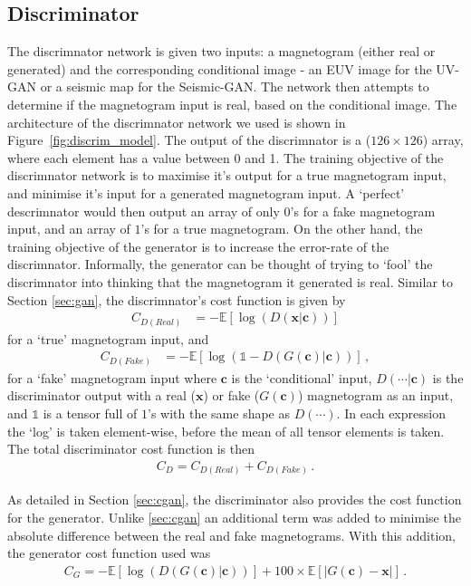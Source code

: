 \documentclass[11pt,a4paper,onecolumn]{report}
\begin{document}
\subsection{Discriminator}
The discrimnator network is given two inputs: a magnetogram (either real or
generated) and the corresponding conditional image - an EUV image for the UV-GAN
or a seismic map for the Seismic-GAN. The network then attempts to determine if
the magnetogram input is real, based on the conditional image. The architecture
of the discrimnator network we used is shown in Figure~\ref{fig:discrim_model}.
The output of the discrimnator is a ($126\times 126$) array, where each element
has a value between 0 and 1. The training objective of the discrimnator network
is to maximise it's output for a true magnetogram input, and minimise it's input
for a generated magnetogram input. A `perfect' descrimnator would then output an
array of only $0$'s for a fake magnetogram input, and an array of $1$'s for a
true magnetogram. On the other hand, the training objective of the generator is
to increase the error-rate of the discrimnator. Informally, the generator can be
thought of trying to `fool' the discrimnator into thinking that the magnetogram
it generated is real. Similar to Section \ref{sec:gan}, the discrimnator's cost
function is given by
\begin{align}
  C_{D(Real)} &= -\mathds{E}\left[\log(D(\mathbf{x}|\mathbf{c}))\right]
\end{align}
for a `true' magnetogram input, and
\begin{align}
  C_{D(Fake)} &=  -\mathds{E}\left[\log(\mathds{1} -  D(G(\mathbf{c})|\mathbf{c}) ) \right]\,,
\end{align}
for a `fake' magnetogram input where $\mathbf{c}$ is the `conditional' input,
$D(\dotsb|\mathbf{c})$ is the discriminator output with a real ($\mathbf{x}$) or
fake ($G(\mathbf{c})$) magnetogram as an input, and $\mathds{1}$ is a tensor
full of $1$'s with the same shape as $D(\dotsb)$. In each expression the `log'
is taken element-wise, before the mean of all tensor elements is taken. The
total discriminator cost function is then
\begin{align}
  C_{D} = C_{D(Real)} + C_{D(Fake)} \,. \label{eqn:d_loss}
\end{align}
\par
As detailed in Section \ref{sec:cgan}, the discriminator also provides the cost
function for the generator. Unlike \ref{sec:cgan} an additional term was added
to minimise the absolute difference between the real and fake magnetograms. With
this addition, the generator cost function used was
\begin{align}
  C_{G} = -\mathds{E}\left[\log(D(G(\mathbf{c})|\mathbf{c}))\right] +
  100 \times \mathds{E}\left[|G(\mathbf{c}) - \mathbf{x}|\right] \,.\label{eqn:G_loss}
\end{align}
\end{document}
